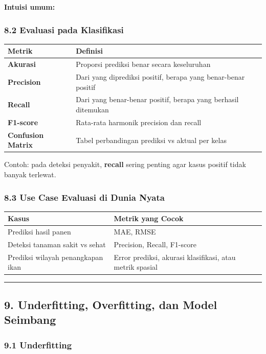 \documentclass[12pt,a4paper]{article}
\begin{document}
\textbf{Intuisi umum:}


\subsubsection{8.2 Evaluasi pada Klasifikasi}

\begin{tabular}{|l|l|}
\hline
Metrik & Definisi \\
\hline
\textbf{Akurasi} & Proporsi prediksi benar secara keseluruhan \\
\hline
\textbf{Precision} & Dari yang diprediksi positif, berapa yang benar-benar positif \\
\hline
\textbf{Recall} & Dari yang benar-benar positif, berapa yang berhasil ditemukan \\
\hline
\textbf{F1-score} & Rata-rata harmonik precision dan recall \\
\hline
\textbf{Confusion Matrix} & Tabel perbandingan prediksi vs aktual per kelas \\
\hline
\end{tabular}


Contoh: pada deteksi penyakit, \textbf{recall} sering penting agar kasus positif tidak banyak terlewat.


\subsubsection{8.3 Use Case Evaluasi di Dunia Nyata}

\begin{tabular}{|l|l|}
\hline
Kasus & Metrik yang Cocok \\
\hline
Prediksi hasil panen & MAE, RMSE \\
\hline
Deteksi tanaman sakit vs sehat & Precision, Recall, F1-score \\
\hline
Prediksi wilayah penangkapan ikan & Error prediksi, akurasi klasifikasi, atau metrik spasial \\
\hline
\end{tabular}


\hrule


\subsection{9. Underfitting, Overfitting, dan Model Seimbang}

\subsubsection{9.1 Underfitting}
\end{document}
